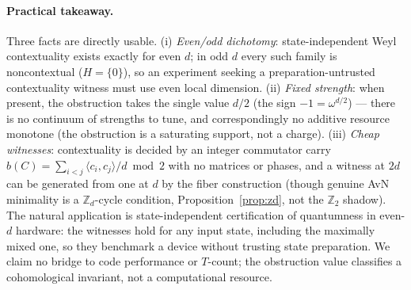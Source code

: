 \documentclass[11pt]{article}
\theoremstyle{remark}
\newcommand{\Z}{\mathbb{Z}}
\newcommand{\ip}[2]{\langle #1,#2\rangle}
\begin{document}
\paragraph{Practical takeaway.} Three facts are directly usable. (i) \emph{Even/odd dichotomy}:
state-independent Weyl contextuality exists exactly for even $d$; in odd $d$ every such family is
noncontextual ($H=\{0\}$), so an experiment seeking a preparation-untrusted contextuality witness must
use even local dimension. (ii) \emph{Fixed strength}: when present, the obstruction takes the single
value $d/2$ (the sign $-1=\omega^{d/2}$) --- there is no continuum of strengths to tune, and
correspondingly no additive resource monotone (the obstruction is a saturating support, not a charge).
(iii) \emph{Cheap witnesses}: contextuality is decided by an integer commutator carry
$b(C)=\sum_{i<j}\ip{c_i}{c_j}/d \bmod 2$ with no matrices or phases, and a witness at $2d$ can be
generated from one at $d$ by the fiber construction (though genuine AvN minimality is a $\Z_d$-cycle
condition, Proposition~\ref{prop:zd}, not the $\Z_2$ shadow). The natural application is
state-independent certification of quantumness in even-$d$ hardware: the witnesses hold for any input
state, including the maximally mixed one, so they benchmark a device without trusting state
preparation. We claim no bridge to code performance or $T$-count; the obstruction value classifies a
cohomological invariant, not a computational resource.
\end{document}
